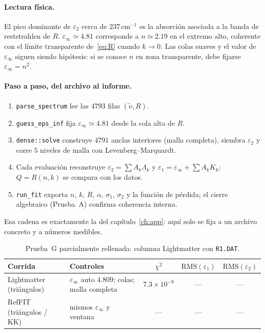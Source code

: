\paragraph{Lectura f\'isica.}
El pico dominante de $\varepsilon_2$ cerca de $237\,\mathrm{cm}^{-1}$ es la absorci\'on asociada a la banda de reststrahlen de $R$.
$\varepsilon_\infty\simeq 4.81$ corresponde a $n\simeq 2.19$ en el extremo alto, coherente con el l\'imite transparente de~\eqref{eq:R} cuando $k\to 0$.
Las colas suaves y el valor de $\varepsilon_\infty$ siguen siendo hip\'otesis: si se conoce $n$ en zona transparente, debe fijarse $\varepsilon_\infty=n^{2}$.

\paragraph{Paso a paso, del archivo al informe.}
\begin{enumerate}[leftmargin=*]
\item \texttt{parse\_spectrum} lee las $4793$ filas $(\tilde\nu,R)$.
\item \texttt{guess\_eps\_inf} fija $\varepsilon_\infty\simeq 4.81$ desde la cola alta de $R$.
\item \texttt{dense::solve} construye $4791$ anclas interiores (malla completa), siembra $\varepsilon_2$ y corre $5$ niveles de malla con Levenberg--Marquardt.
\item Cada evaluaci\'on reconstruye $\varepsilon_2=\sum A_k\Lambda_k$ y $\varepsilon_1=\varepsilon_\infty+\sum A_k K_k$; $Q=R(n,k)$ se compara con los datos.
\item \texttt{run\_fit} exporta $n$, $k$, $R$, $\alpha$, $\sigma_1$, $\sigma_2$ y la funci\'on de p\'erdida; el cierre algebraico (Prueba~A) confirma coherencia interna.
\end{enumerate}
Esa cadena es exactamente la del cap\'itulo~\ref{ch:app}: aqu\'i solo se fija a un archivo concreto y a n\'umeros medibles.

\begin{table}[H]
\centering
\caption{Prueba~G parcialmente rellenada: columna Lightmatter con \texttt{R1.DAT}.}
\label{tab:reffit-filled}
\begin{tabular}{@{}lp{3.8cm}ccc@{}}
\toprule
Corrida & Controles & $\chi^{2}$ & $\mathrm{RMS}(\varepsilon_1)$ & $\mathrm{RMS}(\varepsilon_2)$ \\
\midrule
Lightmatter (tri\'angulos) &
$\varepsilon_\infty$ auto $4.809$; colas; malla completa &
$7.3\times 10^{-9}$ & --- & --- \\
RefFIT (tri\'angulos / KK) & mismos $\varepsilon_\infty$ y ventana &
--- & --- & --- \\
\bottomrule
\end{tabular}
\end{table}


